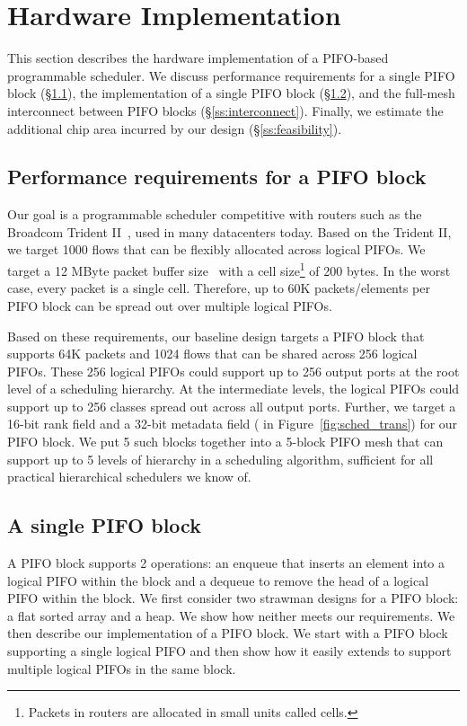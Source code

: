 \section{Hardware Implementation}
\label{s:hardware}
This section describes the hardware implementation of a PIFO-based programmable
scheduler. We discuss performance requirements for a single PIFO block
(\S\ref{ss:performance}), the implementation of a single PIFO block
(\S\ref{ss:single_block}), and the full-mesh interconnect between PIFO blocks
(\S\ref{ss:interconnect}).  Finally, we estimate the additional chip area
incurred by our design (\S\ref{ss:feasibility}).

\subsection{Performance requirements for a PIFO block}
\label{ss:performance}

Our goal is a programmable scheduler competitive with routers such as the
Broadcom Trident II~\cite{trident2}, used in many datacenters today.  Based on
the Trident II, we target 1000 flows that can be flexibly allocated across
logical PIFOs. We target a 12 MByte packet buffer size~\cite{bcom_buffer} with
a cell size\footnote{Packets in routers are allocated in small units called
cells.} of 200 bytes.  In the worst case, every packet is a single cell.
Therefore, up to 60K packets/elements per PIFO block can be spread out over
multiple logical PIFOs.

 Based on these requirements, our baseline design targets a PIFO block that
supports 64K packets and 1024 flows that can be shared across 256 logical
PIFOs. These 256 logical PIFOs could support up to 256 output ports at the root
level of a scheduling hierarchy. At the intermediate levels, the logical PIFOs
could support up to 256 classes spread out across all output ports. Further, we
target a 16-bit rank field and a 32-bit metadata field ( in
Figure~\ref{fig:sched_trans}) for our PIFO block.  We put 5 such blocks
together into a 5-block PIFO mesh that can support up to 5 levels of hierarchy
in a scheduling algorithm, sufficient for all practical hierarchical schedulers
we know of.

\subsection{A single PIFO block}
\label{ss:single_block}

A PIFO block supports 2 operations: an enqueue that inserts an element into a
logical PIFO within the block and a dequeue to remove the head of a logical
PIFO within the block.  We first consider two strawman designs for a PIFO
block: a flat sorted array and a heap.  We show how neither meets our
requirements. We then describe our implementation of a PIFO block. We start
with a PIFO block supporting a single logical PIFO and then show how it easily
extends to support multiple logical PIFOs in the same block.

